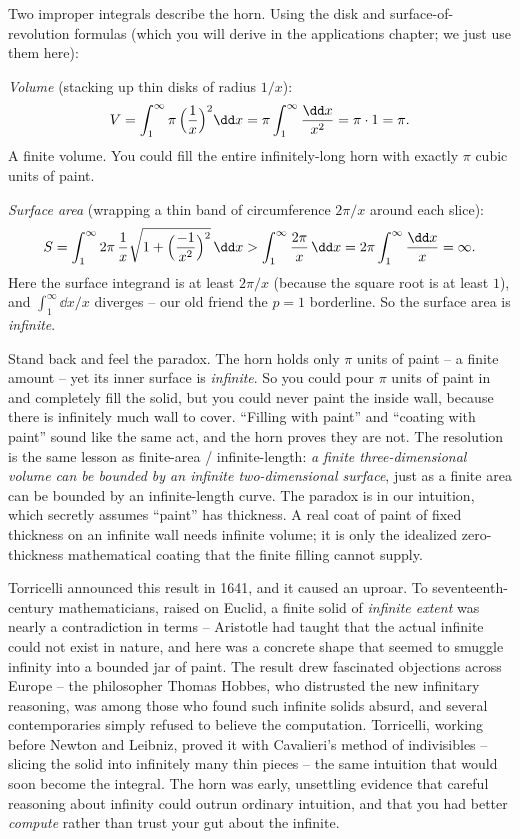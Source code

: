 Two improper integrals describe the horn. Using the disk and surface-of-revolution
formulas (which you will derive in the applications chapter; we just use them here):

\emph{Volume} (stacking up thin disks of radius $1/x$):
\[
  V = \int_1^{\infty} \pi\,\Bigl(\frac{1}{x}\Bigr)^2 \dd x
    = \pi \int_1^{\infty}\frac{\dd x}{x^2}
    = \pi \cdot 1 = \pi.
\]
A finite volume. You could fill the entire infinitely-long horn with exactly $\pi$
cubic units of paint.

\emph{Surface area} (wrapping a thin band of circumference $2\pi/x$ around each
slice):
\[
  S = \int_1^{\infty} 2\pi\,\frac{1}{x}\sqrt{1 + \Bigl(\frac{-1}{x^2}\Bigr)^2}\,\dd x
    > \int_1^{\infty} \frac{2\pi}{x}\,\dd x = 2\pi \int_1^{\infty}\frac{\dd x}{x}
    = \infty.
\]
Here the surface integrand is at least $2\pi/x$ (because the square root is at
least $1$), and $\int_1^\infty \dd x/x$ diverges -- our old friend the $p=1$
borderline. So the surface area is \emph{infinite}.

\begin{aestheticbox}
Stand back and feel the paradox. The horn holds only $\pi$ units of paint -- a
finite amount -- yet its inner surface is \emph{infinite}. So you could pour $\pi$
units of paint in and completely fill the solid, but you could never paint the
inside wall, because there is infinitely much wall to cover. ``Filling with paint''
and ``coating with paint'' sound like the same act, and the horn proves they are
not. The resolution is the same lesson as finite-area / infinite-length: \emph{a
finite three-dimensional volume can be bounded by an infinite two-dimensional
surface}, just as a finite area can be bounded by an infinite-length curve. The
paradox is in our intuition, which secretly assumes ``paint'' has thickness. A
real coat of paint of fixed thickness on an infinite wall needs infinite volume;
it is only the idealized zero-thickness mathematical coating that the finite
filling cannot supply.
\end{aestheticbox}

\begin{historybox}
Torricelli announced this result in 1641, and it caused an uproar. To
seventeenth-century mathematicians, raised on Euclid, a finite solid of
\emph{infinite extent} was nearly a contradiction in terms -- Aristotle had taught
that the actual infinite could not exist in nature, and here was a concrete shape
that seemed to smuggle infinity into a bounded jar of paint. The result drew
fascinated objections across Europe -- the philosopher Thomas Hobbes, who
distrusted the new infinitary reasoning, was among those who found such infinite
solids absurd, and several contemporaries simply refused to believe the
computation. Torricelli, working before Newton and Leibniz, proved it with
Cavalieri's method of indivisibles -- slicing the solid into infinitely many thin
pieces -- the same intuition that would soon become the integral. The horn was
early, unsettling evidence that careful reasoning about infinity could outrun
ordinary intuition, and that you had better \emph{compute} rather than trust your
gut about the infinite.
\end{historybox}

